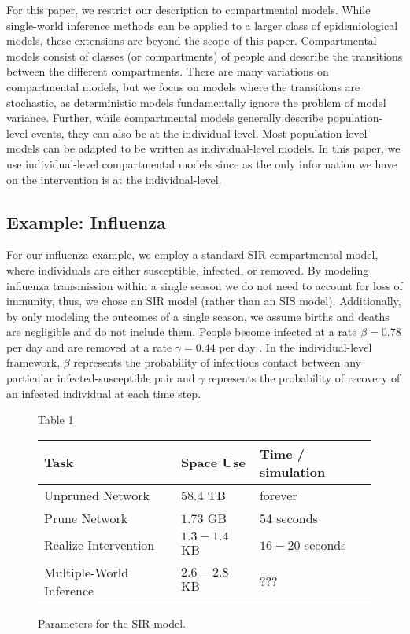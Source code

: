 \documentclass[openacc]{rsproca_new}%
\begin{document}
For this paper, we restrict our description to compartmental models. 
While single-world inference methods can be applied to a larger class of epidemiological models, these extensions are beyond the scope of this paper.
Compartmental models consist of classes (or compartments) of people and describe the transitions between the different compartments.
There are many variations on compartmental models, but we focus on models where the transitions are stochastic, as deterministic models fundamentally ignore the problem of model variance.
Further, while compartmental models generally describe population-level events, they can also be at the individual-level.
Most population-level models can be adapted to be written as individual-level models.
In this paper, we use individual-level compartmental models since as the only information we have on the intervention is at the individual-level.

\subsection{Example: Influenza}

For our influenza example, we employ a standard SIR compartmental model, where individuals are either susceptible, infected, or removed.
By modeling influenza transmission within a single season we do not need to account for loss of immunity, thus, we chose an SIR model (rather than an SIS model). 
Additionally, by only modeling the outcomes of a single season, we assume births and deaths are negligible and do not include them. %
People become infected at a rate $\beta = 0.78$ per day and are removed at a rate $\gamma = 0.44$ per day \cite{forsberg-white-et-al:2009}.
In the individual-level framework, $\beta$ represents the probability of infectious contact between any particular infected-susceptible pair and $\gamma$ represents the probability of recovery of an infected individual at each time step. %

\begin{figure}{Table 1}\label{fig:performance}
\begin{tabular}{|l|l|l|}
  \hline
  Task & Space Use & Time / simulation\\\hline
  Unpruned Network & $58.4$ TB & forever \\\hline
  Prune Network & $1.73$ GB & 54 seconds \\\hline
  Realize Intervention& $1.3-1.4$ KB & $16-20$ seconds \\\hline
  Multiple-World Inference& $2.6-2.8$ KB & ??? \\\hline
\end{tabular}
\caption{Parameters for the SIR model.}
\end{figure}
\end{document}
